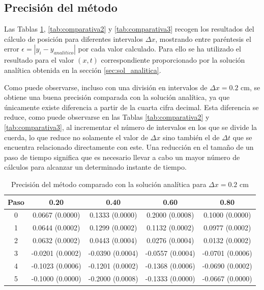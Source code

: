 \documentclass[11pt]{article}
\begin{document}
\subsection{Precisión del método}
Las Tablas \ref{tab:comparativa1}, \ref{tab:comparativa2} y \ref{tab:comparativa3} recogen
los resultados del cálculo de posición para diferentes intervalos $\Delta{x}$, mostrando
entre paréntesis el error $\epsilon = |y_i - y_{analitico}|$ por cada valor calculado.
Para ello se ha utilizado el resultado para el valor $(x,t)$ correspondiente proporcionado
por la solución analítica obtenida en la sección \ref{sec:sol_analitica}.

Como puede observarse, incluso con una división en intervalos de $\Delta{x} = 0.2$ cm, se 
obtiene una buena precisión comparada con la solución analítica, ya que únicamente existe
diferencia a partir de la cuarta cifra decimal. Esta diferencia se reduce, como puede
observarse en las Tablas \ref{tab:comparativa2} y \ref{tab:comparativa3}, al incrementar
el número de intervalos en los que se divide la cuerda, lo que reduce no solamente el
valor de $\Delta{x}$ sino también el de $\Delta{t}$ que se encuentra relacionado
directamente con este. Una reducción en el tamaño de un paso de tiempo significa que es
necesario llevar a cabo un mayor número de cálculos para alcanzar un determinado instante
de tiempo.

\begin{table}
\center
\begin{tabular}{ c c c c c }
\hline
Paso & 0.20 & 0.40 & 0.60 & 0.80 \\
\hline
\hline
0 & 0.0667 (0.0000) & 0.1333 (0.0000) & 0.2000 (0.0008) & 0.1000 (0.0000) \\
1 & 0.0644 (0.0002) & 0.1299 (0.0002) & 0.1132 (0.0002) & 0.0977 (0.0002) \\
2 & 0.0632 (0.0002) & 0.0443 (0.0004) & 0.0276 (0.0004) & 0.0132 (0.0002) \\
3 & -0.0201 (0.0002) & -0.0390 (0.0004) & -0.0557 (0.0004) & -0.0701 (0.0006) \\
4 & -0.1023 (0.0006) & -0.1201 (0.0002) & -0.1368 (0.0006) & -0.0690 (0.0002) \\
5 & -0.1000 (0.0000) & -0.2000 (0.0008) & -0.1333 (0.0000) & -0.0667 (0.0000) \\
\end{tabular}
\caption{Precisión del método comparado con la solución analítica para $\Delta{x} = 0.2$ cm}
\label{tab:comparativa1}
\end{table}
\end{document}
